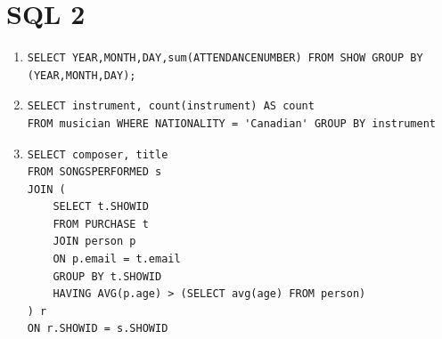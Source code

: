 \documentclass{article}
\begin{document}
\section*{SQL 2}

\begin{enumerate}
  \item \begin{verbatim}
SELECT YEAR,MONTH,DAY,sum(ATTENDANCENUMBER) FROM SHOW GROUP BY (YEAR,MONTH,DAY);
    \end{verbatim}
  \item \begin{verbatim}
SELECT instrument, count(instrument) AS count 
FROM musician WHERE NATIONALITY = 'Canadian' GROUP BY instrument
    \end{verbatim}
  \item \begin{verbatim}
SELECT composer, title 
FROM SONGSPERFORMED s 
JOIN (
	SELECT t.SHOWID
	FROM PURCHASE t 
	JOIN person p
	ON p.email = t.email
	GROUP BY t.SHOWID
	HAVING AVG(p.age) > (SELECT avg(age) FROM person)
) r
ON r.SHOWID = s.SHOWID
    \end{verbatim}
\end{enumerate}
\end{document}
